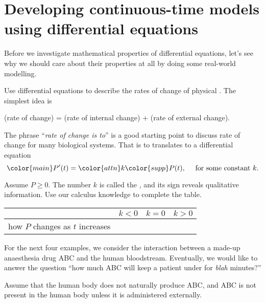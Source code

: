 \documentclass[../main.tex]{subfiles}
\begin{document}
 \section{Developing continuous-time models using differential equations}

Before we investigate mathematical properties of differential equations, let's see why we should care about their properties at all by doing some real-world modelling. 

\begin{method}
  Use differential equations to describe the rates of change of physical .  The simplest idea is
  \begin{center}
    (rate of change) = (rate of internal change) + (rate of external change).
  \end{center}
\end{method}

The phrase ``\emph{rate of change is  to}'' is a good starting point to discuss rate of  change for many biological systems.  That  is  to  translates to a differential equation 
\[
  {\color{main}P'(t)} = {\color{attn} k} {\color{supp} P(t)},\quad \text{ for some constant } k.
\]

Assume \(P \ge 0\).  The number \(k\) is called the , and its sign reveals qualitative information.  Use our calculus knowledge to complete the table.

\begin{table}[H]
  \centering
  \begin{tabular}{r|p{1.5in}|p{1.5in}|p{1.5in}}
  & \(k < 0\) & \(k = 0\) & \(k > 0\) \\ \midrule
    how \(P\) changes as \(t\) increases & & & \\[2ex]
  \end{tabular}
\end{table}

For the next four examples, we consider the interaction between a made-up anaesthesia drug ABC and the human bloodstream. Eventually, we would like to answer the question ``how much ABC will keep a patient under for \emph{blah} minutes?''

Assume that the human body does not naturally produce ABC, and ABC is not present in the human body unless it is administered externally. 
\end{document}
